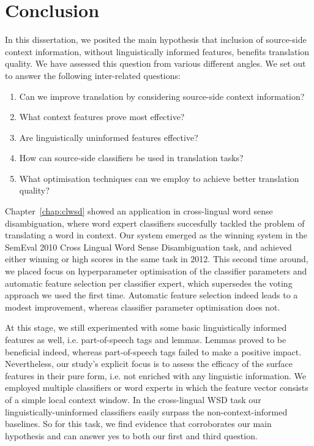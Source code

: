 \chapter{Conclusion}
\label{chap:conclusion}

In this dissertation, we posited the main hypothesis that inclusion of source-side context information, without
linguistically informed features, benefits translation quality. We have
assessed this question from various different angles. We set out to answer
the following inter-related questions:

\begin{enumerate}
\item Can we improve translation by considering source-side context information? 
\item What context features prove most effective?
\item Are linguistically uninformed features effective?
\item How can source-side classifiers be used in translation tasks?
\item What optimisation techniques can we employ to achieve better translation quality?
\end{enumerate}

Chapter~\ref{chap:clwsd} showed an application in cross-lingual word sense
disambiguation, where word expert classifiers succesfully tackled the problem
of translating a word in context. Our system emerged as the winning system in
the SemEval 2010 Cross Lingual Word Sense Disambiguation task, and achieved
either winning or high scores in the same task in 2012. This second time
around, we placed focus on hyperparameter optimisation of the classifier
parameters and automatic feature selection per classifier expert, which
supersedes the voting approach we used the first time. Automatic feature
selection indeed leads to a modest improvement, whereas classifier parameter
optimisation does not.

At this stage, we still experimented with some basic linguistically informed
features as well, i.e. part-of-speech tags and lemmas. Lemmas proved to be
beneficial indeed, whereas part-of-speech tags failed to make a positive
impact. Nevertheless, our study's explicit focus is to assess the efficacy of
the surface features in their pure form, i.e. not enriched with any linguistic
information. We employed multiple classifiers or word experts in which the
feature vector consists of a simple local context window. In the cross-lingual WSD task our linguistically-uninformed
classifiers easily surpass the non-context-informed baselines. So for this
task, we find evidence that corroborates our main hypothesis and can answer yes
to both our first and third question.

